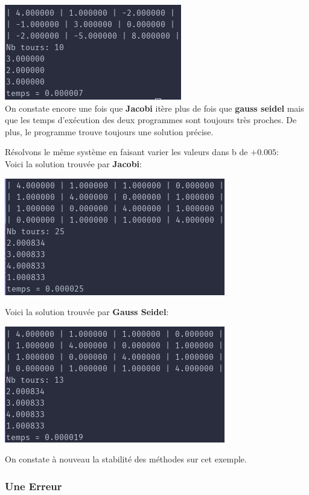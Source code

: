 \documentclass[a4paper]{article}
\begin{document}
\includegraphics[scale=0.5]{./img/gauss_seidel/g_e_ex_4.png}\\

On constate encore une fois que \textbf{Jacobi} itère plus de fois que
\textbf{gauss seidel} mais que les temps d’exécution des deux programmes sont
toujours très proches. De plus, le programme trouve toujours une solution
précise.

Résolvons le même système en faisant varier les valeurs dans b de $+0.005$:\\

Voici la solution trouvée par \textbf{Jacobi}:

\includegraphics[scale=0.5]{./img/jacobi/jac_ex_1_mod.png}

Voici la solution trouvée par \textbf{Gauss Seidel}:

\includegraphics[scale=0.5]{./img/gauss_seidel/g_e_ex_1_mod.png}

On constate à nouveau la stabilité des méthodes sur cet exemple.

\subsubsection{Une Erreur}
\end{document}
